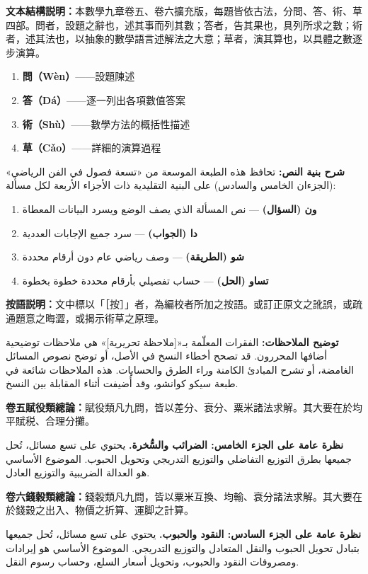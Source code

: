 \documentclass[11pt,a4paper]{article}
\newcommand{\ChinCol}[1]{\begin{minipage}[t]{0.48\textwidth}#1\end{minipage}}
\newcommand{\ArabCol}[1]{\begin{minipage}[t]{0.48\textwidth}\arabicfont\beginR #1\endR\end{minipage}}
\newcommand{\parallelsection}[2]{%
  \noindent\ChinCol{#1}\hfill\ArabCol{#2}\par\vspace{0.5cm}%
}
\begin{document}
\parallelsection{%
\textbf{文本結構説明：}本數學九章卷五、卷六擴充版，每題皆依古法，分問、答、術、草四部。問者，設題之辭也，述其事而列其數；答者，告其果也，具列所求之數；術者，述其法也，以抽象的數學語言述解法之大意；草者，演其算也，以具體之數逐步演算。
\begin{enumerate}[leftmargin=1.5em]
  \item \textbf{問（W\`{e}n）}——設題陳述
  \item \textbf{答（D\'{a}）}——逐一列出各項數值答案
  \item \textbf{術（Sh\`{u}）}——數學方法的概括性描述
  \item \textbf{草（C\v{a}o）}——詳細的演算過程
\end{enumerate}%
}{%
\textbf{شرح بنية النص:} تحافظ هذه الطبعة الموسعة من «تسعة فصول في الفن الرياضي» (الجزءان الخامس والسادس) على البنية التقليدية ذات الأجزاء الأربعة لكل مسألة:
\begin{enumerate}[leftmargin=1.5em]
  \item \textbf{ون (السؤال)} --- نص المسألة الذي يصف الوضع ويسرد البيانات المعطاة
  \item \textbf{دا (الجواب)} --- سرد جميع الإجابات العددية
  \item \textbf{شو (الطريقة)} --- وصف رياضي عام دون أرقام محددة
  \item \textbf{تساو (الحل)} --- حساب تفصيلي بأرقام محددة خطوة بخطوة
\end{enumerate}%
}

\parallelsection{%
\textbf{按語説明：}文中標以「［按］」者，為編校者所加之按語。或訂正原文之訛誤，或疏通題意之晦澀，或揭示術草之原理。%
}{%
\textbf{توضيح الملاحظات:} الفقرات المعلّمة بـ«[ملاحظة تحريرية]» هي ملاحظات توضيحية أضافها المحررون. قد تصحح أخطاء النسخ في الأصل، أو توضح نصوص المسائل الغامضة، أو تشرح المبادئ الكامنة وراء الطرق والحسابات. هذه الملاحظات شائعة في طبعة سيكو كوانشو، وقد أُضيفت أثناء المقابلة بين النسخ.%
}

\parallelsection{%
\textbf{卷五賦役類總論：}賦役類凡九問，皆以差分、衰分、粟米諸法求解。其大要在於均平賦税、合理分攤。%
}{%
\textbf{نظرة عامة على الجزء الخامس: الضرائب والسُّخرة.} يحتوي على تسع مسائل، تُحل جميعها بطرق التوزيع التفاضلي والتوزيع التدريجي وتحويل الحبوب. الموضوع الأساسي هو العدالة الضريبية والتوزيع العادل.%
}

\parallelsection{%
\textbf{卷六錢穀類總論：}錢穀類凡九問，皆以粟米互換、均輸、衰分諸法求解。其大要在於錢穀之出入、物價之折算、運脚之計算。%
}{%
\textbf{نظرة عامة على الجزء السادس: النقود والحبوب.} يحتوي على تسع مسائل، تُحل جميعها بتبادل تحويل الحبوب والنقل المتعادل والتوزيع التدريجي. الموضوع الأساسي هو إيرادات ومصروفات النقود والحبوب، وتحويل أسعار السلع، وحساب رسوم النقل.%
}
\end{document}
